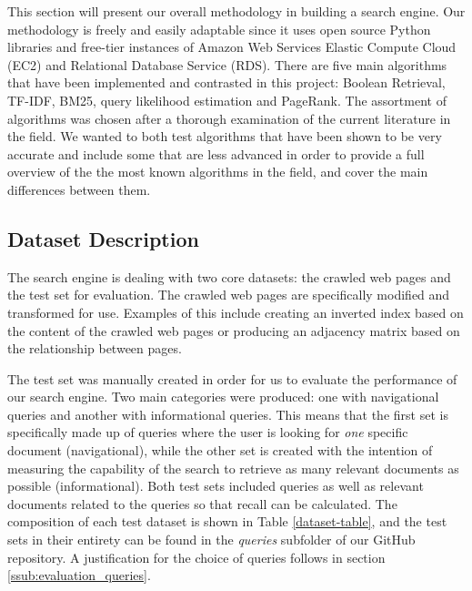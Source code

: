 This section will present our overall methodology in building a search engine. Our methodology is freely and easily adaptable since it uses open source Python libraries and free-tier instances of Amazon Web Services Elastic Compute Cloud (EC2) and Relational Database Service (RDS). There are five main algorithms that have been implemented and contrasted in this project: Boolean Retrieval, TF-IDF, BM25, query likelihood estimation and PageRank. The assortment of algorithms was chosen after a thorough examination of the current literature in the field. We wanted to both test algorithms that have been shown to be very accurate and include some that are less advanced in order to provide a full overview of the the most known algorithms in the field, and cover the main differences between them. 

\subsection{Dataset Description} %
\label{sub:dataset_description}

The search engine is dealing with two core datasets: the crawled web pages and the test set for evaluation. The crawled web pages are specifically modified and transformed for use. Examples of this include creating an inverted index based on the content of the crawled web pages or producing an adjacency matrix based on the relationship between pages. 

The test set was manually created in order for us to evaluate the performance of our search engine. Two main categories were produced: one with navigational queries and another with informational queries. This means that the first set is specifically made up of queries where the user is looking for \emph{one} specific document (navigational), while the other set is created with the intention of measuring the capability of the search to retrieve as many relevant documents as possible (informational). Both test sets included queries as well as relevant documents related to the queries so that recall can be calculated. The composition of each test dataset is shown in Table \ref{dataset-table}, and the test sets in their entirety can be found in the \emph{queries} subfolder of our GitHub repository.  A justification for the choice of queries follows in section \ref{ssub:evaluation_queries}.

